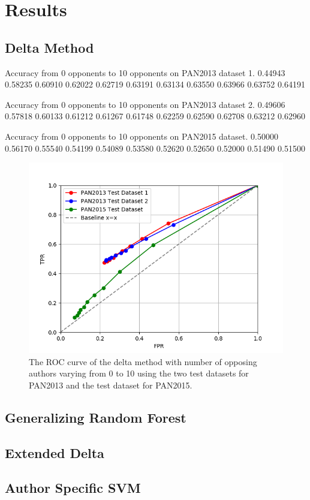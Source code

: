\section{Results}

\subsection{Delta Method}
Accuracy from 0 opponents to 10 opponents on PAN2013 dataset 1.
0.44943
0.58235
0.60910
0.62022
0.62719
0.63191
0.63134
0.63550
0.63966
0.63752
0.64191

Accuracy from 0 opponents to 10 opponents on PAN2013 dataset 2.
0.49606
0.57818
0.60133
0.61212
0.61267
0.61748
0.62259
0.62590
0.62708
0.63212
0.62960


Accuracy from 0 opponents to 10 opponents on PAN2015 dataset.
0.50000
0.56170
0.55540
0.54199
0.54089
0.53580
0.52620
0.52650
0.52000
0.51490
0.51500

\begin{figure}
    \centering
    \includegraphics[width=.7\textwidth]{./pictures/delta_method_roc.png}
    \caption{The ROC curve of the delta method with number of opposing authors
    varying from 0 to 10 using the two test datasets for PAN2013 and the test
    dataset for PAN2015.}
    \label{fig:delta_method_roc}
\end{figure}

\subsection{Generalizing Random Forest}

\subsection{Extended Delta}

\subsection{Author Specific SVM}
